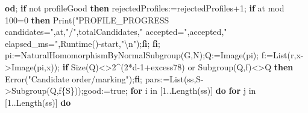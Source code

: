 \documentclass[
  10pt,
  letterpaper,
]{article}
\newenvironment{Shaded}{}{}
\newcommand{\BuiltInTok}[1]{\textcolor[rgb]{0.00,0.50,0.00}{#1}}
\newcommand{\ConstantTok}[1]{\textcolor[rgb]{0.53,0.00,0.00}{#1}}
\newcommand{\ControlFlowTok}[1]{\textcolor[rgb]{0.00,0.44,0.13}{\textbf{#1}}}
\newcommand{\ExtensionTok}[1]{#1}
\newcommand{\FloatTok}[1]{\textcolor[rgb]{0.25,0.63,0.44}{#1}}
\newcommand{\NormalTok}[1]{#1}
\newcommand{\OperatorTok}[1]{\textcolor[rgb]{0.40,0.40,0.40}{#1}}
\newcommand{\OtherTok}[1]{\textcolor[rgb]{0.00,0.44,0.13}{#1}}
\newcommand{\StringTok}[1]{\textcolor[rgb]{0.25,0.44,0.63}{#1}}
\newcommand{\VariableTok}[1]{\textcolor[rgb]{0.10,0.09,0.49}{#1}}
\begin{document}
\begin{Shaded}
\begin{Highlighting}[]
  \ControlFlowTok{od}\OperatorTok{;}
  \ControlFlowTok{if} \ConstantTok{not} \VariableTok{profileGood} \ControlFlowTok{then}
   \VariableTok{rejectedProfiles}\OperatorTok{:=}\VariableTok{rejectedProfiles}\OperatorTok{+}\FloatTok{1}\OperatorTok{;}
   \ControlFlowTok{if} \VariableTok{at} \OtherTok{mod} \FloatTok{100}\OperatorTok{=}\FloatTok{0} \ControlFlowTok{then} \BuiltInTok{Print}\NormalTok{(}\StringTok{"PROFILE\_PROGRESS candidates="}\OperatorTok{,}\VariableTok{at}\OperatorTok{,}\StringTok{"/"}\OperatorTok{,}\VariableTok{totalCandidates}\OperatorTok{,}\StringTok{" accepted="}\OperatorTok{,}\VariableTok{accepted}\OperatorTok{,}\StringTok{" elapsed\_ms="}\OperatorTok{,}\BuiltInTok{Runtime}\NormalTok{()}\OperatorTok{{-}}\VariableTok{start}\OperatorTok{,}\StringTok{"\textbackslash{}n"}\NormalTok{)}\OperatorTok{;}\ControlFlowTok{fi}\OperatorTok{;}
  \ControlFlowTok{fi}\OperatorTok{;}
  \VariableTok{pi}\OperatorTok{:=}\BuiltInTok{NaturalHomomorphismByNormalSubgroup}\NormalTok{(}\VariableTok{G}\OperatorTok{,}\VariableTok{N}\NormalTok{)}\OperatorTok{;}\VariableTok{Q}\OperatorTok{:=}\BuiltInTok{Image}\NormalTok{(}\VariableTok{pi}\NormalTok{)}\OperatorTok{;}
  \VariableTok{f}\OperatorTok{:=}\BuiltInTok{List}\NormalTok{(}\VariableTok{r}\OperatorTok{,}\VariableTok{x}\OperatorTok{{-}\textgreater{}}\BuiltInTok{Image}\NormalTok{(}\VariableTok{pi}\OperatorTok{,}\VariableTok{x}\NormalTok{))}\OperatorTok{;}
  \ControlFlowTok{if} \BuiltInTok{Size}\NormalTok{(}\VariableTok{Q}\NormalTok{)}\OperatorTok{\textless{}\textgreater{}}\FloatTok{2}\OperatorTok{\^{}}\NormalTok{(}\FloatTok{2}\OperatorTok{*}\VariableTok{d}\OperatorTok{{-}}\FloatTok{1}\OperatorTok{+}\VariableTok{excess78}\NormalTok{) }\ConstantTok{or} \BuiltInTok{Subgroup}\NormalTok{(}\VariableTok{Q}\OperatorTok{,}\VariableTok{f}\NormalTok{)}\OperatorTok{\textless{}\textgreater{}}\VariableTok{Q} \ControlFlowTok{then} \BuiltInTok{Error}\NormalTok{(}\StringTok{"Candidate order/marking"}\NormalTok{)}\OperatorTok{;}\ControlFlowTok{fi}\OperatorTok{;}
  \VariableTok{pars}\OperatorTok{:=}\BuiltInTok{List}\NormalTok{(}\VariableTok{ss}\OperatorTok{,}\VariableTok{S}\OperatorTok{{-}\textgreater{}}\BuiltInTok{Subgroup}\NormalTok{(}\VariableTok{Q}\OperatorTok{,}\VariableTok{f}\NormalTok{\{}\VariableTok{S}\NormalTok{\}))}\OperatorTok{;}\VariableTok{good}\OperatorTok{:=}\ConstantTok{true}\OperatorTok{;}
  \ControlFlowTok{for} \VariableTok{i} \ExtensionTok{in}\NormalTok{ [}\FloatTok{1}\OperatorTok{..}\BuiltInTok{Length}\NormalTok{(}\VariableTok{ss}\NormalTok{)] }\ControlFlowTok{do} \ControlFlowTok{for} \VariableTok{j} \ExtensionTok{in}\NormalTok{ [}\FloatTok{1}\OperatorTok{..}\BuiltInTok{Length}\NormalTok{(}\VariableTok{ss}\NormalTok{)] }\ControlFlowTok{do}

\end{Highlighting}
\end{Shaded}
\end{document}
